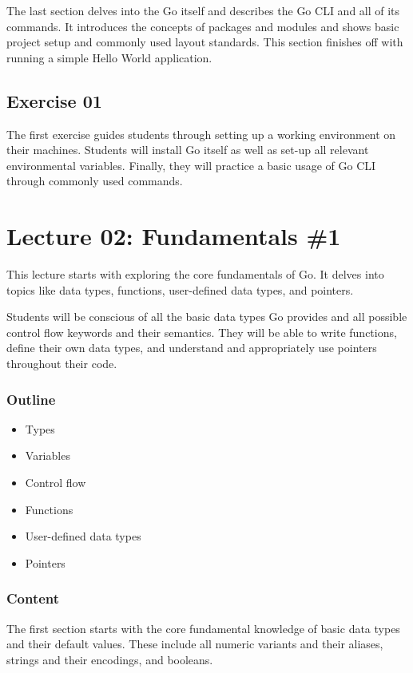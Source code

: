 \documentclass[
  digital,
  color,
  oneside,
  nosansbold,
  nocolorbold,
  nolof,
  nolot,
]{fithesis4}
\begin{document}
The last section delves into the Go itself and describes the Go CLI and all of its commands. It introduces the concepts of packages and modules and shows basic project setup and commonly used layout standards. This section finishes off with running a simple Hello World application.

\subsection{Exercise 01}

The first exercise guides students through setting up a working environment on their machines. Students will install Go itself as well as set-up all relevant environmental variables. Finally, they will practice a basic usage of Go CLI through commonly used commands.

\section{Lecture 02: Fundamentals \#1}

This lecture starts with exploring the core fundamentals of Go. It delves into topics like data types, functions, user-defined data types, and pointers.

Students will be conscious of all the basic data types Go provides and all possible control flow keywords and their semantics. They will be able to write functions, define their own data types, and understand and appropriately use pointers throughout their code.

\subsubsection{Outline}

\begin{itemize}
    \item Types
    \item Variables
    \item Control flow
    \item Functions
    \item User-defined data types
    \item Pointers
\end{itemize}

\subsubsection{Content}

The first section starts with the core fundamental knowledge of basic data types and their default values. These include all numeric variants and their aliases, strings and their encodings, and booleans.
\end{document}
